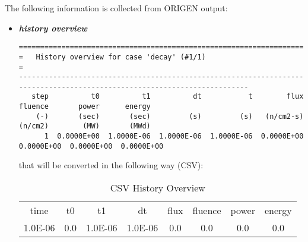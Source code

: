 The following information is collected from ORIGEN output:
\begin{itemize}
  \item \textit{\textbf{history overview}}
  \begin{lstlisting}[basicstyle=\tiny]
=========================================================================================================================
=   History overview for case 'decay' (#1/1)                                                                            =
-------------------------------------------------------------------------------------------------------------------------
   step          t0          t1          dt           t        flux     fluence       power      energy
    (-)       (sec)       (sec)         (s)         (s)   (n/cm2-s)     (n/cm2)        (MW)       (MWd)
      1  0.0000E+00  1.0000E-06  1.0000E-06  1.0000E-06  0.0000E+00  0.0000E+00  0.0000E+00  0.0000E+00
\end{lstlisting}
   that will be converted in the following way (CSV):
    \begin{table}[h]
    \centering
    \caption{CSV History Overview}
    \label{CSVhistoryOverview}
    \tabcolsep=0.11cm
    \tiny
    \begin{tabular}{|c|c|c|c|c|c|c|c|}
    \hline
     time    & t0  & t1      & dt      & flux & fluence & power & energy \\
     1.0E-06 & 0.0 & 1.0E-06 & 1.0E-06 & 0.0  & 0.0     & 0.0   & 0.0
    \end{tabular}
   \end{table}


\end{itemize}
